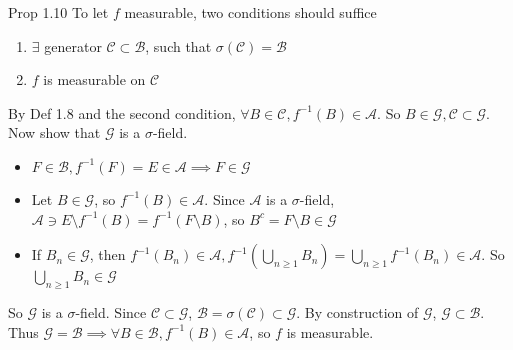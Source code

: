 \begin{note}{Prop 1.10}
    To let $f$ measurable, two conditions should suffice
    \begin{enumerate}
        \item $\exists $ generator $\mathcal{C}\subset \mathcal{B}$, such that $\sigma(\mathcal{C})=\mathcal{B}$
        \item $f$ is measurable on $\mathcal{C}$
    \end{enumerate}
    By Def 1.8 and the second condition, $\forall B\in \mathcal{C},f^{-1}(B)\in \mathcal{A}$. So $B\in \mathcal{G},\mathcal{C}\subset\mathcal{G}$. Now show that $\mathcal{G}$ is a $\sigma$-field.
    \begin{itemize}
        \item $F\in\mathcal{B},f^{-1}(F)=E\in \mathcal{A}\implies F\in \mathcal{G}$
        \item Let $B\in \mathcal{G}$, so $f^{-1}(B)\in \mathcal{A}$. Since $\mathcal{A}$ is a $\sigma$-field, $\mathcal{A}\ni E\setminus f^{-1}(B)=f^{-1}(F\setminus B)$, so $B^c=F\setminus B\in \mathcal{G}$
        \item If $B_n\in \mathcal{G}$, then $f^{-1}(B_n)\in \mathcal{A},f^{-1}(\bigcup_{n\ge 1} B_n)=\bigcup_{n\ge 1} f^{-1}(B_n)\in \mathcal{A}$. So $\bigcup_{n\ge 1} B_n\in \mathcal{G}$
    \end{itemize}
    So $\mathcal{G}$ is a $\sigma$-field. Since $\mathcal{C}\subset\mathcal{G}$, $\mathcal{B}=\sigma(\mathcal{C})\subset\mathcal{G}$. By construction of $\mathcal{G}$, $\mathcal{G}\subset \mathcal{B}$. Thus $\mathcal{G}=\mathcal{B}\implies \forall B\in \mathcal{B},f^{-1}(B)\in \mathcal{A}$, so $f$ is measurable.
\end{note}

